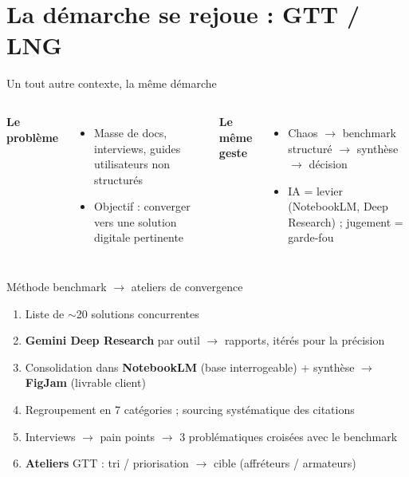 \section{La démarche se rejoue : GTT / LNG}

\begin{frame}{Un tout autre contexte, la même démarche}
  \begin{columns}[T]
    \textbf{Le problème}
    \begin{itemize}\footnotesize
      \item Masse de docs, interviews, guides utilisateurs \alert{non structurés}
      \item Objectif : converger vers une solution digitale pertinente
    \end{itemize}
    \textbf{Le même geste}
    \begin{itemize}\footnotesize
      \item Chaos $\to$ \alert{benchmark structuré} $\to$ synthèse $\to$ décision
      \item IA = levier (NotebookLM, Deep Research) ; jugement = garde-fou
    \end{itemize}
  \end{columns}
  \vskip 6pt
\end{frame}

\begin{frame}{Méthode benchmark $\to$ ateliers de convergence}
  \footnotesize
  \begin{enumerate}
    \item Liste de $\sim$20 solutions concurrentes
    \item \textbf{Gemini Deep Research} par outil $\to$ rapports, itérés pour la précision
    \item Consolidation dans \textbf{NotebookLM} (base interrogeable) + synthèse $\to$ \textbf{FigJam} (livrable client)
    \item Regroupement en \alert{7 catégories} ; sourcing systématique des citations
    \item Interviews $\to$ pain points $\to$ \alert{3 problématiques} crois\'ees avec le benchmark
    \item \textbf{Ateliers} GTT : tri / priorisation $\to$ cible (affréteurs / armateurs)
  \end{enumerate}
  \vskip 4pt
\end{frame}
